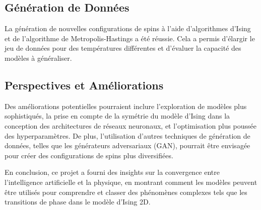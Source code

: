 \documentclass[11pt, parskip=half]{scrartcl} %
\begin{document}
\subsection*{Génération de Données}

La génération de nouvelles configurations de spins à l'aide d'algorithmes d'Ising et de l'algorithme de Metropolis-Hastings a été réussie. Cela a permis d'élargir le jeu de données pour des températures différentes et d'évaluer la capacité des modèles à généraliser.

\subsection*{Perspectives et Améliorations}

Des améliorations potentielles pourraient inclure l'exploration de modèles plus sophistiqués, la prise en compte de la symétrie du modèle d'Ising dans la conception des architectures de réseaux neuronaux, et l'optimisation plus poussée des hyperparamètres. De plus, l'utilisation d'autres techniques de génération de données, telles que les générateurs adversariaux (GAN), pourrait être envisagée pour créer des configurations de spins plus diversifiées.

En conclusion, ce projet a fourni des insights sur la convergence entre l'intelligence artificielle et la physique, en montrant comment les modèles peuvent être utilisés pour comprendre et classer des phénomènes complexes tels que les transitions de phase dans le modèle d'Ising 2D.



\nocite{noauthor_ising_2023}

\appendix
\end{document}
